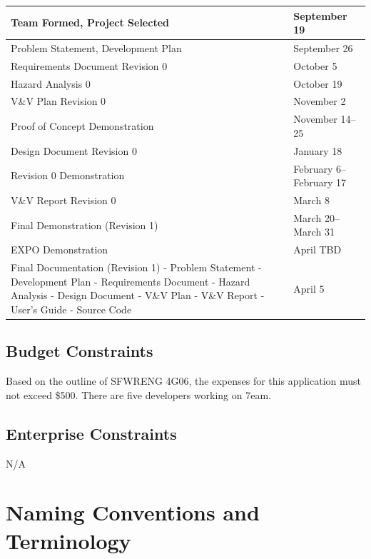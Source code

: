 \documentclass[12pt]{article}
\begin{document}
\begin{tabular}{ |p{9.7cm} l|}
	\hline
	Team Formed, Project Selected & September 19\\
	\hline
	Problem Statement, Development Plan & September 26\\
	\hline
	Requirements Document Revision 0 & October 5\\
	\hline
	Hazard Analysis 0 & October 19\\
	\hline
	V\&V Plan Revision 0 & November 2\\
	\hline
	Proof of Concept Demonstration & November 14--25\\
	\hline
	Design Document Revision 0 & January 18\\
	\hline
	Revision 0 Demonstration & February 6--February 17\\
	\hline
	V\&V Report Revision 0 & March 8\\
	\hline
	Final Demonstration (Revision 1) & March 20--March 31\\
	\hline
	EXPO Demonstration & April TBD\\
	\hline
	Final Documentation (Revision 1)\newline 
	- Problem Statement\newline
	- Development Plan\newline
	- Requirements Document\newline
	- Hazard Analysis\newline
	- Design Document\newline
	- V\&V Plan\newline
	- V\&V Report\newline
	- User's Guide\newline
	- Source Code\newline & April 5\\
	\hline
\end{tabular}

\subsection{Budget Constraints}
Based on the outline of SFWRENG 4G06, the expenses for this application must not exceed \$500. There are five developers working on 7eam.

\subsection{Enterprise Constraints}
N/A

\section{Naming Conventions and Terminology}
\end{document}
